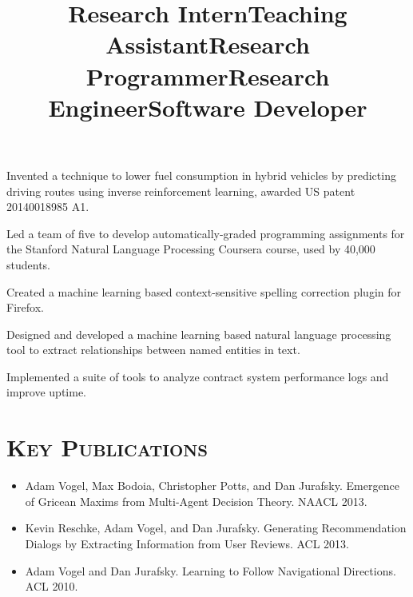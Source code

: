 \begin{resume}
 \title{Research Intern}
 \begin{position}
  Invented a technique to lower fuel consumption in hybrid vehicles by predicting driving routes using inverse reinforcement learning, awarded US patent 20140018985 A1.
 \end{position}

 \title{Teaching Assistant}
 \begin{position}
 Led a team of five to develop automatically-graded programming assignments for the Stanford Natural Language Processing Coursera course, used by 40,000 students.
 \end{position}

 \title{Research Programmer}
 \begin{position}
 Created a machine learning based context-sensitive spelling correction plugin for Firefox.  
 \end{position}

 \title{Research Engineer}
 \begin{position}
	Designed and developed a machine learning based natural language
	processing tool to extract relationships between named 
	entities in text. 
 \end{position}

 \title{Software Developer}
 \begin{position}
Implemented a suite of tools to analyze contract system performance logs and improve uptime. 
 \end{position}

\section{\textsc{Key Publications}}
\begin{itemize}
\item Adam Vogel, Max Bodoia, Christopher Potts, and Dan Jurafsky. Emergence of Gricean Maxims from Multi-Agent Decision Theory. NAACL 2013.
\item Kevin Reschke, Adam Vogel, and Dan Jurafsky. Generating Recommendation Dialogs by Extracting Information from User Reviews. ACL 2013.
\item Adam Vogel and Dan Jurafsky. Learning to Follow Navigational Directions. ACL 2010.
\end{itemize}


\end{resume}
